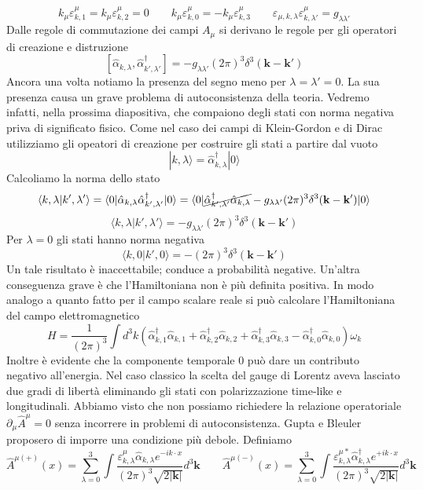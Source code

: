 $$
k_\mu \varepsilon^{\mu}_{k,1} = k_\mu \varepsilon^{\mu}_{k,2} = 0 \qquad k_\mu \varepsilon^{\mu}_{k,0} = -k_\mu \varepsilon^{\mu}_{k,3} \qquad \varepsilon_{\mu, k, \lambda} \varepsilon^{\mu}_{k, \lambda'} = g_{\lambda\lambda'}
$$
Dalle regole di commutazione dei campi $A_\mu$ si derivano le regole per gli operatori di creazione e distruzione
$$
[\hat{\alpha}_{k,\lambda}, \hat{\alpha}_{k',\lambda'}^\dagger] = -g_{\lambda\lambda'} (2\pi)^3 \delta^3(\mathbf{k} - \mathbf{k}')
$$
Ancora una volta notiamo la presenza del segno meno per $\lambda=\lambda'=0$. La sua presenza causa un grave problema di autoconsistenza della teoria. Vedremo infatti, nella prossima diapositiva, che compaiono degli stati con norma negativa priva di significato fisico. Come nel caso dei campi di Klein-Gordon e di Dirac utilizziamo gli opeatori di creazione per costruire gli stati a partire dal vuoto
$$
|k, \lambda\rangle = \hat{\alpha}_{k, \lambda}^\dagger |0\rangle
$$
Calcoliamo la norma dello stato
$$
\langle k, \lambda | k', \lambda' \rangle = \langle 0 | \hat{\alpha}_{k, \lambda} \hat{\alpha}_{k', \lambda'}^\dagger |0\rangle = \langle 0 | \cancel{\hat{\alpha}_{k', \lambda'}^\dagger \hat{\alpha}_{k, \lambda}} - g_{\lambda\lambda'} (2\pi)^3 \delta^3(\mathbf{k} - \mathbf{k}') |0\rangle
$$
$$
\langle k, \lambda | k', \lambda' \rangle = -g_{\lambda\lambda'} (2\pi)^3 \delta^3(\mathbf{k} - \mathbf{k}')
$$
Per $\lambda=0$ gli stati hanno norma negativa 
$$
\langle k, 0 | k', 0 \rangle = - (2\pi)^3 \delta^3(\mathbf{k} - \mathbf{k}')
$$
Un tale risultato è inaccettabile; conduce a probabilità negative. Un'altra conseguenza grave è che l'Hamiltoniana non è più definita positiva. In modo analogo a quanto fatto per il campo scalare reale si può calcolare l'Hamiltoniana del campo elettromagnetico
$$
H = \frac{1}{(2\pi)^3} \int d^3k (\hat{\alpha}_{k,1}^\dagger \hat{\alpha}_{k,1} + \hat{\alpha}_{k,2}^\dagger \hat{\alpha}_{k,2} + \hat{\alpha}_{k,3}^\dagger \hat{\alpha}_{k,3} - \hat{\alpha}_{k,0}^\dagger \hat{\alpha}_{k,0}) \omega_k
$$
Inoltre è evidente che la componente temporale $0$ può dare un contributo negativo all'energia. Nel caso classico la scelta del gauge di Lorentz aveva lasciato due gradi di libertà eliminando gli stati con polarizzazione time-like e longitudinali. Abbiamo visto che non possiamo richiedere la relazione operatoriale $\partial_\mu \hat{A}^\mu=0$ senza incorrere in problemi di autoconsistenza. Gupta e Bleuler proposero di imporre una condizione più debole. Definiamo
$$
\hat{A}^{\mu(+)}(x) = \sum_{\lambda=0}^3 \int \frac{\varepsilon^\mu_{k,\lambda} \hat{\alpha}_{k,\lambda} e^{-ik\cdot x}}{(2\pi)^3 \sqrt{2|\mathbf{k}|}} d^3\mathbf{k} \qquad\hat{A}^{\mu(-)}(x) = \sum_{\lambda=0}^3 \int \frac{\varepsilon^{\mu*}_{k,\lambda} \hat{\alpha}_{k,\lambda}^\dagger e^{+ik\cdot x}}{(2\pi)^3 \sqrt{2|\mathbf{k}|}} d^3\mathbf{k}
$$
